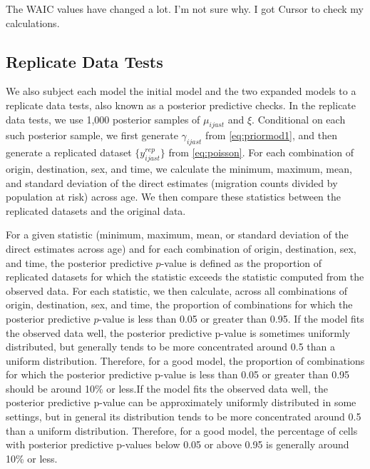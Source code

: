\documentclass{article}
\begin{document}
{{\color{cyan} The WAIC values have changed a lot. I'm not sure why. I got Cursor to check my calculations.}

\subsection{Replicate Data Test{\color{magenta}s}}

We also subject {\color{yellow}each model} {\color{magenta}the initial model and the two expanded models} to {\color{yellow}a} replicate data test{\color{magenta}s}, also known as {\color{yellow}a} posterior predictive check{\color{magenta}s}. In the replicate data test{\color{magenta}s}, we use 1,000 posterior samples of $\mu_{ijast}$ and $\xi$. Conditional on each such posterior sample, we first generate $\gamma_{ijast}$ from \eqref{eq:priormod1}, and then generate a replicated dataset 
$\{y_{ijast}^{rep}\}$ from \eqref{eq:poisson}. For each combination of origin, destination, sex, and time, we calculate the minimum, maximum, mean, and standard deviation of the direct estimates (migration counts divided by population at risk) across age. We then compare these statistics between the replicated datasets and the original data. 

For a given statistic (minimum, maximum, mean, or standard deviation of the direct estimates across age) and for each combination of origin, destination, sex, and time, the posterior predictive $p$-value is defined as the proportion of replicated datasets for which the statistic exceeds the statistic computed from the observed data. For each statistic, we then calculate, across all combinations of origin, destination, sex, and time, the proportion of combinations for which the posterior predictive 
$p$-value is less than 0.05 or greater than 0.95. {\color{yellow}If the model fits the observed data well, the posterior predictive p-value is sometimes uniformly distributed, but generally tends to be more concentrated around 0.5 than a uniform distribution. Therefore, for a good model, the proportion of combinations for which the posterior predictive p-value is less than 0.05 or greater than 0.95 should be around 10\% or less.}{\color{magenta}If the model fits the observed data well, the posterior predictive p-value can be approximately uniformly distributed in some settings, but in general its distribution tends to be more concentrated around 0.5 than a uniform distribution. Therefore, for a good model, the percentage of cells with posterior predictive p-values below 0.05 or above 0.95 is generally around 10\% or less.}

}
\end{document}
